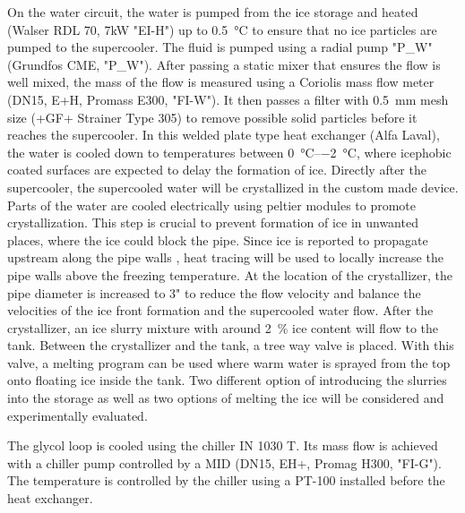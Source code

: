 \documentclass[english]{SFOEYearlyReportEnglish_2018}
\begin{document}
On the water circuit, the water is pumped from the ice storage and heated (Walser RDL 70, 7kW "EI-H") up to \SI{0.5}{\celsius} to ensure that no ice particles are pumped to the supercooler. The fluid is pumped using a radial pump "P\_W" (Grundfos CME, "P\_W"). After passing a static mixer that ensures the flow is well mixed, the mass of the flow is measured using a Coriolis mass flow meter (DN15, E+H, Promass E300, "FI-W"). It then passes a filter with \SI{0.5}{mm} mesh size (+GF+ Strainer Type 305) to remove possible solid particles before it reaches the supercooler. In this welded plate type heat exchanger (Alfa Laval), the water is cooled down to temperatures between \SIrange{0}{-2}{\celsius}, where icephobic coated surfaces are expected to delay the formation of ice. Directly after the supercooler, the supercooled water will be crystallized in the custom made device. Parts of the water are cooled electrically using peltier modules to promote crystallization. This step is crucial to prevent formation of ice in unwanted places, where the ice could block the pipe. Since ice is reported to propagate upstream along the pipe walls  \citep{mito_new_2002}, heat tracing will be used to locally increase the pipe walls above the freezing temperature. At the location of the crystallizer, the pipe diameter is increased to \si{3}{"} to reduce the flow velocity and balance the velocities of the ice front formation and the supercooled water flow. After the crystallizer, an ice slurry mixture with around 2~\% ice content will flow to the tank. Between the crystallizer and the tank, a tree way valve is placed. With this valve, a melting program can be used where warm water is sprayed from the top onto floating ice inside the tank. Two different option of introducing the slurries into the storage as  well as two options of melting the ice will be considered and experimentally evaluated.


The glycol loop is cooled using the chiller IN 1030 T. Its mass flow is achieved with a chiller pump controlled by a MID (DN15, EH+, Promag H300, "FI-G"). The temperature is controlled by the chiller using a PT-100 installed before the heat exchanger. 
\end{document}
